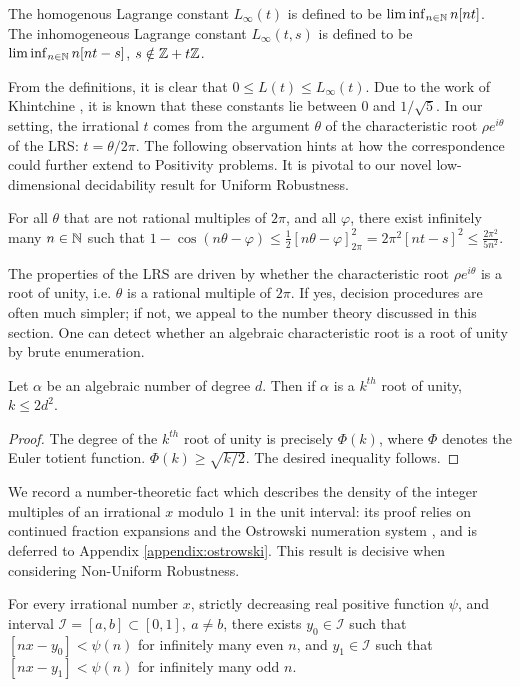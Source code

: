 \begin{definition}
\label{def:Linfty}
The homogenous Lagrange constant $L_\infty(t)$ is defined to be $\liminf_{n \in \mathbb{N}} n[nt]$. The inhomogeneous Lagrange constant $L_\infty(t, s)$ is defined to be\\ $\liminf_{n \in \mathbb{N}} n[nt - s]$, $s \notin \mathbb{Z} + t\mathbb{Z}$.
\end{definition} 

From the definitions, it is clear that $0 \le L(t) \le L_\infty(t)$. Due to the work of Khintchine \cite{khintchine}, it is known that these constants lie between $0$ and ${1}/{\sqrt{5}}$. In our setting, the irrational $t$ comes from the argument $\theta$ of the characteristic root $\rho e^{i\theta}$ of the LRS: $t = \theta/2\pi$. The following observation hints at how the correspondence could further extend to Positivity problems. It is pivotal to our novel low-dimensional decidability result for Uniform Robustness.
\begin{lemma}
\label{eq:quadraticdecay}
For all $\theta$ that are not rational multiples of $2\pi$, and all $\varphi$, there exist infinitely many $n\in \mathbb{N}$ such that
$
1 - \cos(n\theta- \varphi) \le \frac{1}{2}\left[n\theta - \varphi \right]_{2\pi}^2 = 2\pi^2[nt -s]^2 \le \frac{2\pi^2}{5n^2}.
$
\end{lemma}

The properties of the LRS are driven by whether the characteristic root $\rho e^{i\theta}$ is a root of unity, i.e. $\theta$ is a rational multiple of $2\pi$. If yes, decision procedures are often much simpler; if not, we appeal to the number theory discussed in this section. One can detect whether an algebraic characteristic root is a root of unity by brute enumeration.

\begin{lemma}
\label{lemma:rootofunity}
Let $\alpha$ be an algebraic number of degree $d$. Then if $\alpha$ is a $k^{th}$ root of unity, $k \le 2d^2$.
\end{lemma}
\begin{proof}
The degree of the $k^{th}$ root of unity is precisely $\Phi(k)$, where $\Phi$ denotes the Euler totient function. $\Phi(k) \ge \sqrt{k/2}$. The desired inequality follows.
\end{proof}

We record a number-theoretic fact which describes the density of the integer multiples of an irrational $x$ modulo $1$ in the unit interval: its proof relies on continued fraction expansions and the Ostrowski numeration system \cite{bourla2016ostrowski,berthe2022dynamics}, and is deferred to Appendix \ref{appendix:ostrowski}. This result is decisive when considering Non-Uniform Robustness.
\begin{lemma}
\label{lemma:existsreal}
For every irrational number $x$, strictly decreasing real positive function $\psi$, and interval $\mathcal{I} = [a, b] \subset [0, 1], ~ a \ne b$, there exists $y_0 \in \mathcal{I}$ such that $[nx - y_0] < \psi(n)$ for infinitely many even $n$, and $y_1 \in \mathcal{I}$ such that $[nx - y_1] < \psi(n)$ for infinitely many odd $n$.
\end{lemma}

